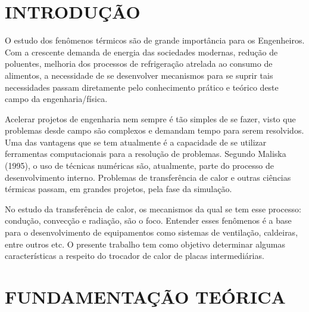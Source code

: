 \documentclass[a4paper,12pt,oneside]{article}
\begin{document}
\pagebreak
\clearpage
\newpage


\begin{center}
	
	\renewcommand{\contentsname}{\large SUMÁRIO}
	
	 \tableofcontents
\end{center}
\thispagestyle{empty}


\pagebreak
\clearpage
\newpage
		
		
			
\begin{flushright}
\justify
	
	
	\section{\large INTRODUÇÃO}
	\vspace{0.5cm}
	
	O estudo dos fenômenos térmicos são de grande importância para os Engenheiros. Com a crescente demanda de energia das sociedades modernas, redução de poluentes, melhoria dos processos de refrigeração atrelada ao consumo de alimentos, a necessidade de se desenvolver mecanismos para se suprir tais necessidades passam diretamente pelo conhecimento prático e teórico deste campo da engenharia/física.
	
	Acelerar projetos de engenharia nem sempre é tão simples de se fazer, visto que problemas desde campo são complexos e demandam tempo para serem resolvidos. Uma das vantagens que se tem atualmente é a capacidade de se utilizar ferramentas computacionais para a resolução de problemas. Segundo Maliska (1995), o uso de técnicas numéricas são, atualmente, parte do processo de desenvolvimento interno. Problemas de transferência de calor e outras ciências térmicas passam, em grandes projetos, pela fase da simulação.
	
	No estudo da transferência de calor, os mecanismos da qual se tem esse processo: condução, convecção e radiação, são o foco. Entender esses fenômenos é a base para o desenvolvimento de equipamentos como sistemas de ventilação, caldeiras, entre outros etc. O presente trabalho tem como objetivo determinar algumas características a respeito do trocador de calor de placas intermediárias.
	
	\pagebreak
	\clearpage
	\newpage
	
	
\section{\large FUNDAMENTAÇÃO TEÓRICA}
\vspace{0.5cm}


\end{flushright}
\end{document}
